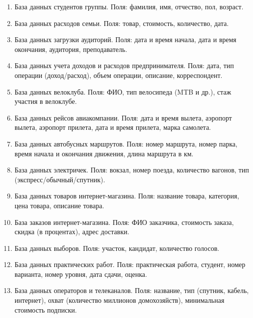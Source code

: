 \documentclass{article}
\begin{document}
\begin{enumerate}

    \item
    База данных студентов группы. Поля: фамилия, имя, отчество, пол, возраст.

    \item
    База данных расходов семьи. Поля: товар, стоимость, количество, дата.

    \item
    База данных загрузки аудиторий. Поля: дата и время начала,
    дата и время окончания, аудитория, преподаватель.

    \item
    База данных учета доходов и расходов предпринимателя. Поля: дата,
    тип операции (доход/расход), объем операции, описание, корреспондент.

    \item
    База данных велоклуба. Поля: ФИО, тип велосипеда (MTB и др.),
    стаж участия в велоклубе.

    \item
    База данных рейсов авиакомпании. Поля: дата и время вылета,
    аэропорт вылета, аэропорт прилета, дата и время прилета,
    марка самолета.

    \item
    База данных автобусных маршрутов. Поля: номер маршрута, номер парка,
    время начала и окончания движения, длина маршрута в км.

    \item
    База данных электричек. Поля: вокзал, номер поезда,
    количество вагонов, тип (экспресс/обычный/спутник).

    \item
    База данных товаров интернет-магазина. Поля: название товара,
    категория, цена товара, описание товара.

    \item
    База заказов интернет-магазина. Поля: ФИО заказчика, стоимость заказа,
    скидка (в процентах), адрес доставки.

    \item
    База данных выборов. Поля: участок, кандидат, количество голосов.

    \item
    База данных практических работ. Поля: практическая работа, студент,
    номер варианта, номер уровня, дата сдачи, оценка.

    \item
    База данных операторов и телеканалов. Поля: название, тип
    (спутник, кабель, интернет), охват (количество миллионов домохозяйств),
    минимальная стоимость подписки.


\end{enumerate}
\end{document}
